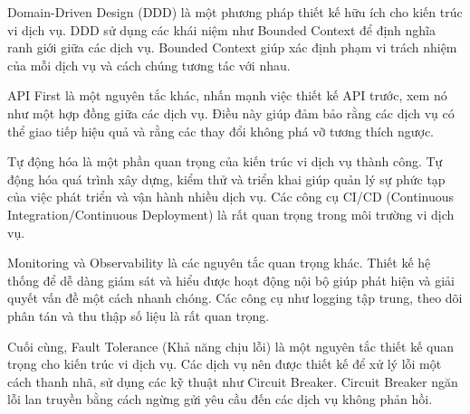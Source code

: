 Domain-Driven Design (DDD) là một phương pháp thiết kế hữu ích cho kiến trúc
vi dịch vụ. DDD sử dụng các khái niệm như Bounded Context để định nghĩa ranh
giới giữa các dịch vụ. Bounded Context giúp xác định phạm vi trách nhiệm của
mỗi dịch vụ và cách chúng tương tác với nhau.

API First là một nguyên tắc khác, nhấn mạnh việc thiết kế API trước, xem nó như
một hợp đồng giữa các dịch vụ. Điều này giúp đảm bảo rằng các dịch vụ có thể
giao tiếp hiệu quả và rằng các thay đổi không phá vỡ tương thích ngược.

Tự động hóa là một phần quan trọng của kiến trúc vi dịch vụ thành công. Tự
động hóa quá trình xây dựng, kiểm thử và triển khai giúp quản lý sự phức tạp
của việc phát triển và vận hành nhiều dịch vụ. Các công cụ CI/CD (Continuous
Integration/Continuous Deployment) là rất quan trọng trong môi trường
vi dịch vụ.

Monitoring và Observability là các nguyên tắc quan trọng khác. Thiết kế hệ
thống để dễ dàng giám sát và hiểu được hoạt động nội bộ giúp phát hiện và giải
quyết vấn đề một cách nhanh chóng. Các công cụ như logging tập trung, theo dõi
phân tán và thu thập số liệu là rất quan trọng.

Cuối cùng, Fault Tolerance (Khả năng chịu lỗi) là một nguyên tắc thiết kế quan
trọng cho kiến trúc vi dịch vụ. Các dịch vụ nên được thiết kế để xử lý lỗi
một cách thanh nhã, sử dụng các kỹ thuật như Circuit Breaker. Circuit Breaker
ngăn lỗi lan truyền bằng cách ngừng gửi yêu cầu đến các dịch vụ không phản hồi.